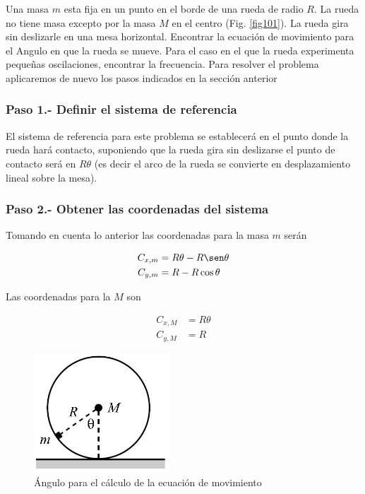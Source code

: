 \documentclass[12pt]{book}
\theoremstyle{definition}
\theoremstyle{remark}
\theoremstyle{plain}
\begin{document}
Una masa $m$ esta fija en un punto en el borde de una rueda de radio $R$. La rueda no tiene masa excepto por la masa $M$ en el centro (Fig. \ref{fig101}). La rueda gira sin deslizarle en una mesa horizontal. Encontrar la ecuación de movimiento para el Angulo en que la rueda se mueve. Para el caso en el que la rueda experimenta pequeñas oscilaciones, encontrar la frecuencia.
Para resolver el problema aplicaremos de nuevo los pasos indicados en la sección anterior

\subsubsection{Paso 1.- Definir el sistema de referencia}

El sistema de referencia para este problema se establecerá en el punto donde la rueda hará contacto, suponiendo que la rueda gira sin deslizarse el punto de contacto será en $R \theta$ (es decir el arco de la rueda se convierte en desplazamiento lineal sobre la mesa). 

\subsubsection{Paso 2.- Obtener las coordenadas del sistema }

Tomando en cuenta lo anterior las coordenadas para la masa $m$ serán 

\begin{equation}
\label{equ023}
\begin{aligned}
C_{x,m} & =R \theta - R \sen \theta \\
C_{y,m} & =R- R \cos \theta
\end{aligned}
\end{equation}

Las coordenadas para la $M$ son

\begin{equation}
\label{equ024}
\begin{aligned}
C_{x,M} & =R \theta  \\
C_{y,M} & =R
\end{aligned}
\end{equation}

\begin{figure}
\centering
\includegraphics[width=2in]{Angulorueda.jpeg}
\caption{Ángulo para el cálculo de la ecuación de movimiento}
\label{fig102}
\end{figure}
\end{document}
